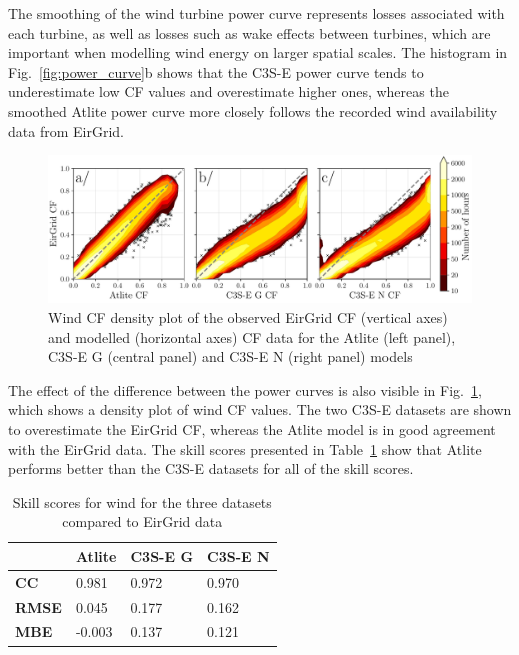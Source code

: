 \documentclass[a4paper, 11pt]{article}
\begin{document}
The smoothing of the wind turbine power curve represents losses associated with each turbine, as well as losses such as wake effects between turbines, which are important when modelling wind energy on larger spatial scales. The histogram in Fig.~\ref{fig:power_curve}b shows that the C3S-E power curve tends to underestimate low CF values and overestimate higher ones, whereas the smoothed Atlite power curve more closely follows the recorded wind availability data from EirGrid.

\begin{figure}[!ht]
	\centering
	\includegraphics[width=\textwidth]{verification_wind_contour}
	\caption{Wind CF density plot of the observed EirGrid CF (vertical axes) and modelled (horizontal axes) CF data for the Atlite  (left panel), C3S-E G (central panel) and C3S-E N (right panel) models}
	\label{fig:wind_verification_contour}
\end{figure}

The effect of the difference between the power curves is also visible in Fig.~\ref{fig:wind_verification_contour}, which shows a density plot of wind CF values. The two C3S-E datasets are shown to overestimate the EirGrid CF, whereas the Atlite model is in good agreement with the EirGrid data. The skill scores presented in Table~\ref{tab:wind_skill_scores} show that Atlite performs better than the C3S-E datasets for all of the skill scores. 

\begin{table}[!ht]
	\centering
	\begin{tabular}{l|lll|}
		\cline{2-4}
		& \textbf{Atlite} & \textbf{C3S-E G} & \textbf{C3S-E N} \\ \hline
		\multicolumn{1}{|l|}{\textbf{CC}}   & 0.981           & 0.972            & 0.970            \\ \hline
		\multicolumn{1}{|l|}{\textbf{RMSE}} & 0.045           & 0.177            & 0.162            \\ \hline
		\multicolumn{1}{|l|}{\textbf{MBE}}   & -0.003          & 0.137            & 0.121            \\ \hline
	\end{tabular}
	\caption{Skill scores for wind for the three datasets compared to EirGrid data}
	\label{tab:wind_skill_scores}
\end{table}
\end{document}
